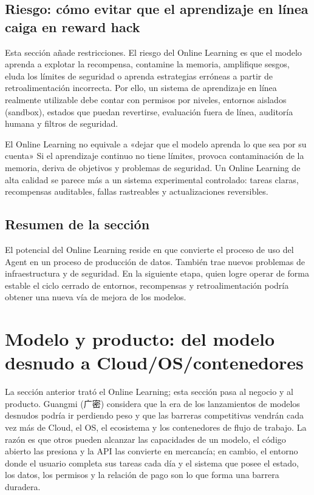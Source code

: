 \documentclass[a4paper]{article}
\begin{document}
\subsection{Riesgo: cómo evitar que el aprendizaje en línea caiga en reward hack}

Esta sección añade restricciones. El riesgo del Online Learning es que el modelo aprenda a explotar la recompensa, contamine la memoria, amplifique sesgos, eluda los límites de seguridad o aprenda estrategias erróneas a partir de retroalimentación incorrecta. Por ello, un sistema de aprendizaje en línea realmente utilizable debe contar con permisos por niveles, entornos aislados (sandbox), estados que puedan revertirse, evaluación fuera de línea, auditoría humana y filtros de seguridad.

\begin{warningbox}{El Online Learning no equivale a «dejar que el modelo aprenda lo que sea por su cuenta»}
Si el aprendizaje continuo no tiene límites, provoca contaminación de la memoria, deriva de objetivos y problemas de seguridad. Un Online Learning de alta calidad se parece más a un sistema experimental controlado: tareas claras, recompensas auditables, fallas rastreables y actualizaciones reversibles.
\end{warningbox}

\subsection{Resumen de la sección}

El potencial del Online Learning reside en que convierte el proceso de uso del Agent en un proceso de producción de datos. También trae nuevos problemas de infraestructura y de seguridad. En la siguiente etapa, quien logre operar de forma estable el ciclo cerrado de entornos, recompensas y retroalimentación podría obtener una nueva vía de mejora de los modelos.
\section{Modelo y producto: del modelo desnudo a Cloud/OS/contenedores}

La sección anterior trató el Online Learning; esta sección pasa al negocio y al producto. Guangmi (广密) considera que la era de los lanzamientos de modelos desnudos podría ir perdiendo peso y que las barreras competitivas vendrán cada vez más de Cloud, el OS, el ecosistema y los contenedores de flujo de trabajo. La razón es que otros pueden alcanzar las capacidades de un modelo, el código abierto las presiona y la API las convierte en mercancía; en cambio, el entorno donde el usuario completa sus tareas cada día y el sistema que posee el estado, los datos, los permisos y la relación de pago son lo que forma una barrera duradera.
\end{document}
